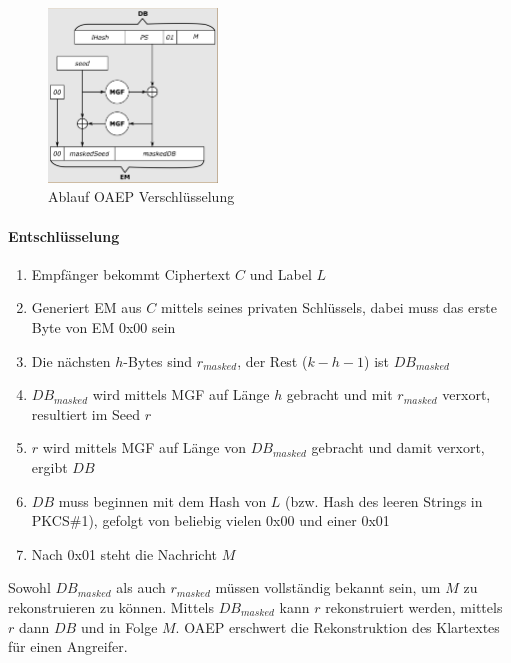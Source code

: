 \begin{figure}[h]
    \includegraphics[width=0.4\textwidth]{figures/fig08-oaep}
    \centering
    \caption{Ablauf OAEP Verschlüsselung}
\end{figure}

\paragraph{Entschlüsselung}

\begin{enumerate}
    \item Empfänger bekommt Ciphertext $C$ und Label $L$
    \item Generiert EM aus $C$ mittels seines privaten Schlüssels, dabei muss das erste Byte von EM 0x00 sein
    \item Die nächsten $h$-Bytes sind $r_{masked}$, der Rest ($k - h - 1$) ist $DB_{masked}$
    \item $DB_{masked}$ wird mittels MGF auf Länge $h$ gebracht und mit $r_{masked}$ verxort, resultiert im Seed $r$
    \item $r$ wird mittels MGF auf Länge von $DB_{masked}$ gebracht und damit verxort, ergibt $DB$
    \item $DB$ muss beginnen mit dem Hash von $L$ (bzw. Hash des leeren Strings in PKCS\#1), gefolgt von beliebig vielen 0x00 und einer 0x01
    \item Nach 0x01 steht die Nachricht $M$
\end{enumerate}

Sowohl $DB_{masked}$ als auch $r_{masked}$ müssen vollständig bekannt sein, um $M$ zu rekonstruieren zu können. Mittels $DB_{masked}$ kann $r$ rekonstruiert werden, 
mittels $r$ dann $DB$ und in Folge $M$.
OAEP erschwert die Rekonstruktion des Klartextes für einen Angreifer. \\

